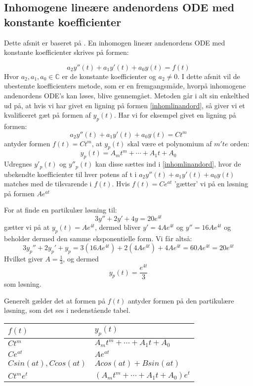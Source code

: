 \subsection{Inhomogene lineære andenordens ODE med konstante koefficienter}
Dette afsnit er baseret på \citep[s. 240-246]{JAB}.\hfill \break
En inhomogen lineær andenordens ODE med konstante koefficienter skrives på formen:

\begin{equation}
\label{inhomlinandord}
    a_2y''(t)+a_1y'(t)+a_0y(t)=f(t)
\end{equation} \hfill \break
Hvor $a_2,a_1,a_0\in \mathbb{C}$ er de konstante koefficienter og $a_2 \neq 0$. I dette afsnit vil de ubestemte koefficienters metode, som er en fremgangsmåde, hvorpå inhomogene andenordens ODE's kan løses, blive gennemgået.
Metoden går i alt sin enkelthed ud på, at hvis vi har givet en ligning på formen \eqref{inhomlinandord}, så giver vi et kvalificeret gæt på formen af $y_p(t)$. Har vi for eksempel givet en ligning på formen:
\begin{equation*}
    a_2y''(t)+a_1y'(t)+a_0y(t)=Ct^m
\end{equation*} \hfill \break
antyder formen $f(t)=Ct^m$, at $y_p(t)$ skal være et polynomium af $m'te$ orden:
\begin{equation*}
    y_p(t)=A_mt^m+\cdots +A_1t+A_0
\end{equation*} \hfill \break
Udregnes $y'_p(t)$ og $y''_p(t)$ kan disse sættes ind i \ref{inhomlinandord}, hvor de ubekendte koefficienter til hver potens af t i $a_2y''(t)+a_1y'(t)+a_0y(t)$ matches med de tilsvarende i $f(t)$. 
Hvis $f(t)=Ce^{at}$ 'gætter' vi på en løsning på formen $Ae^{at}$
\begin{Example}\hfill \break
\textnormal{For at finde en partikulær løsning til:}\hfill \break
$$3y''+2y'+4y=20e^{4t}$$ \hfill \break
\textnormal{gætter vi på at $y_p(t)=Ae^{4t}$, dermed bliver $y'=4Ae^{4t}$ og $y''=16Ae^{4t}$ og beholder dermed den samme eksponentielle form. Vi får altså:} \hfill \break
$$3y_p''+2y_p'+y_p=3(16Ae^{4t})+2(4Ae^{4t})+4Ae^{4t}=60Ae^ {4t}=20e^{4t}$$ \hfill \break
\textnormal{Hvilket giver $A=\frac{1}{3}$, og dermed} \hfill \break
$$y_p(t)=\frac{e^{4t}}{3}$$ \textnormal{som løsning.}

\end{Example}
Generelt gælder det at formen på $f(t)$ antyder formen på den partikulære løsning, som det ses i nedenstående tabel. 
\begin{table}[H]
    \centering
    \begin{tabular}{|l|l|}
    \hline
       $f(t)$  & $y_p(t)$ \\ \hline
        $Ct^m$ & $A_mt^m+\cdots +A_1t+A_0$ \\ \hline
        $Ce^{at}$ & $Ae^{at}$ \\ \hline
        $C sin(at) , C cos(at)$ & $ A cos(at) + B sin(at)$ \\ \hline
        $Ct^me^t$ & $(A_mt^m+ \cdots +A_1t+A_0)e^t$ \\ \hline
        \end{tabular}
\end{table}
